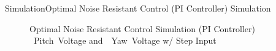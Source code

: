 \documentclass{beamer}
\begin{document}
\begin{frame}{Simulation}{Optimal Noise Resistant Control (PI Controller) Simulation}
    \begin{figure}
      \centering
      \caption{Optimal Noise Resistant Control Simulation (PI Controller) ~Pitch~Voltage and~~Yaw~Voltage w/ Step Input}
      \label{fig:LQG_PI_Sim_volt}
    \end{figure}
\end{frame}
\end{document}
